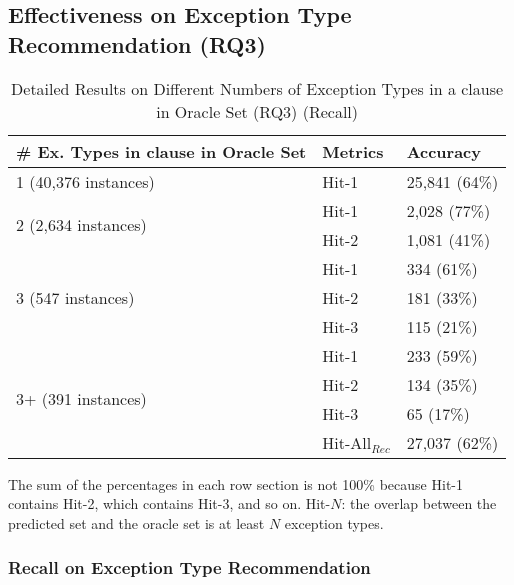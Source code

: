 \subsection{Effectiveness on Exception Type Recommendation (RQ3)}
\label{sec:rq3}

\begin{table}[t]
  \caption{Detailed Results on Different Numbers of Exception Types in a
     clause in Oracle Set (RQ3) (Recall)}
  \vspace{-12pt}
	{\small
	  \begin{center}
            \tabcolsep 3.5pt
			\renewcommand{\arraystretch}{1}
			\begin{tabular}{p{4.5cm}<{\centering}|p{1.3cm}<{\centering}|p{1.5cm}<{\centering}}
				\hline
				\# Ex. Types in \code{catch} clause in Oracle Set & Metrics &  Accuracy\\
				\hline
				\multirow{1}{*}{1 (40,376 instances)}   & Hit-1  & 25,841 (64\%) \\
				\hline
				\multirow{2}{*}{2 (2,634 instances)}  & Hit-1   & 2,028 (77\%) \\
				& Hit-2         &  1,081 (41\%) \\
				\hline
				\multirow{3}{*}{3 (547 instances)}  & Hit-1    & 334 (61\%) \\
				& Hit-2     & 181 (33\%)\\
				& Hit-3     & 115 (21\%) \\
				\hline
				\multirow{4}{*}{3+ (391 instances)}  & Hit-1   & 233 (59\%) \\
				& Hit-2     & 134 (35\%) \\
				& Hit-3     & 65 (17\%)\\
                                \hline
                                & Hit-All$_{Rec}$ & 27,037 (62\%)\\
				\hline
			\end{tabular}
	                The sum of the percentages in each row section is not 100\% because Hit-1 contains Hit-2, which contains Hit-3, and so on. Hit-$N$: the overlap between the predicted set and the oracle set is at least $N$ exception types.
			\label{tab:recall-3}
		\end{center}
	}
\end{table}

\subsubsection{{\bf Recall on Exception Type Recommendation}}
\label{sec:req3-recall}

